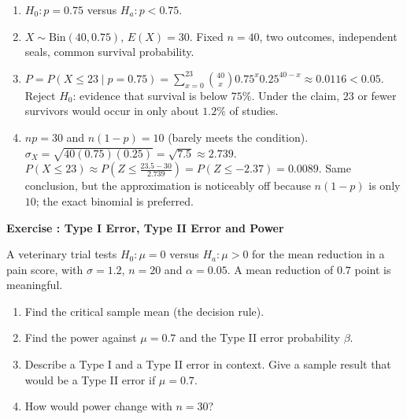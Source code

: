 \documentclass[11pt]{article}
\newcounter{exercise}
\newcommand{\exercise}[1]{%
  \par\medskip
  \refstepcounter{exercise}%
  {\large\bfseries\color{CourseBlue} Exercise \theexercise: #1}\par\smallskip}
\begin{document}
\begin{solution}
\begin{enumerate}
  \item $H_0:p=0.75$ versus $H_a:p<0.75$.
  \item $X\sim\text{Bin}(40,0.75)$, $E(X)=30$. Fixed $n=40$, two outcomes, independent seals, common survival probability.
  \item $P=P(X\leq23\mid p=0.75)=\sum_{x=0}^{23}\binom{40}{x}0.75^x0.25^{40-x}\approx0.0116<0.05$. Reject $H_0$: evidence that survival is below $75\%$. Under the claim, $23$ or fewer survivors would occur in only about $1.2\%$ of studies.
  \item $np=30$ and $n(1-p)=10$ (barely meets the condition). $\sigma_X=\sqrt{40(0.75)(0.25)}=\sqrt{7.5}\approx2.739$. $P(X\leq23)\approx P\left(Z\leq\frac{23.5-30}{2.739}\right)=P(Z\leq-2.37)=0.0089$. Same conclusion, but the approximation is noticeably off because $n(1-p)$ is only $10$; the exact binomial is preferred.
\end{enumerate}
\end{solution}

\exercise{Type I Error, Type II Error and Power}

A veterinary trial tests $H_0:\mu=0$ versus $H_a:\mu>0$ for the mean reduction in a pain score, with $\sigma=1.2$, $n=20$ and $\alpha=0.05$. A mean reduction of $0.7$ point is meaningful.

\begin{enumerate}
  \item Find the critical sample mean (the decision rule).
  \item Find the power against $\mu=0.7$ and the Type II error probability $\beta$.
  \item Describe a Type I and a Type II error in context. Give a sample result that would be a Type II error if $\mu=0.7$.
  \item How would power change with $n=30$?
\end{enumerate}
\end{document}
